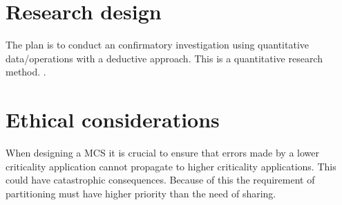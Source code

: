 \section{Research design}
\label{sec:research}
The plan is to conduct an confirmatory investigation using quantitative data/operations with a deductive approach. This is a quantitative research method. \cite{hakansson2013}.\\ %



\section{Ethical considerations}
When designing a MCS it is crucial to ensure that errors made by a lower criticality application cannot propagate to higher criticality applications. This could have catastrophic consequences. Because of this the requirement of partitioning must have higher priority than the need of sharing.
